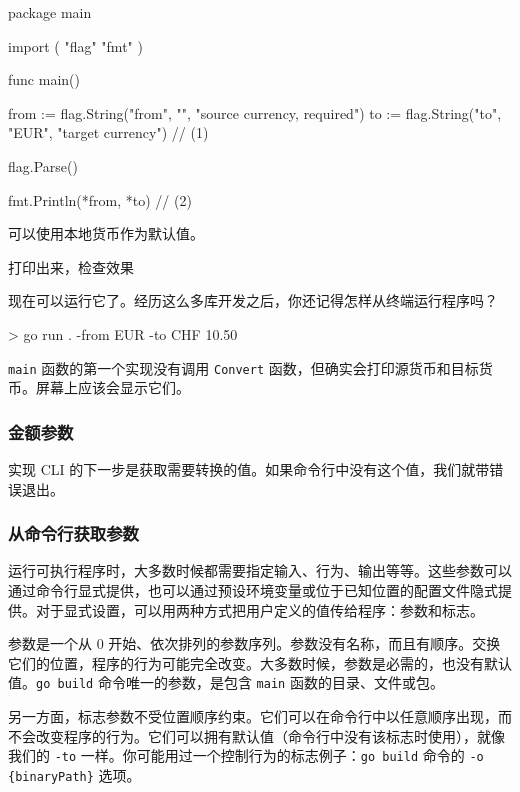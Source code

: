 \begin{gocode}[title={代码清单 6.26 \texttt{main.go}：解析标志}]
package main

import (
    "flag"
    "fmt"
)

func main() {
    from := flag.String("from", "", "source currency, required")
    to := flag.String("to", "EUR", "target currency") // (1)

    flag.Parse()

    fmt.Println(*from, *to) // (2)
}
\end{gocode}

\begin{codeannotations}
\item 可以使用本地货币作为默认值。
\item 打印出来，检查效果
\end{codeannotations}

现在可以运行它了。经历这么多库开发之后，你还记得怎样从终端运行程序吗？

\begin{shellcode}[]
> go run . -from EUR -to CHF 10.50
\end{shellcode}

\texttt{main} 函数的第一个实现没有调用 \texttt{Convert} 函数，但确实会打印源货币和目标货币。屏幕上应该会显示它们。

\subsubsection*{金额参数}

实现 CLI 的下一步是获取需要转换的值。如果命令行中没有这个值，我们就带错误退出。

\subsubsection*{从命令行获取参数}

运行可执行程序时，大多数时候都需要指定输入、行为、输出等等。这些参数可以通过命令行显式提供，也可以通过预设环境变量或位于已知位置的配置文件隐式提供。对于显式设置，可以用两种方式把用户定义的值传给程序：参数和标志。

参数是一个从 0 开始、依次排列的参数序列。参数没有名称，而且有顺序。交换它们的位置，程序的行为可能完全改变。大多数时候，参数是必需的，也没有默认值。\texttt{go build} 命令唯一的参数，是包含 \texttt{main} 函数的目录、文件或包。

另一方面，标志参数不受位置顺序约束。它们可以在命令行中以任意顺序出现，而不会改变程序的行为。它们可以拥有默认值（命令行中没有该标志时使用），就像我们的 \texttt{-to} 一样。你可能用过一个控制行为的标志例子：\texttt{go build} 命令的 \texttt{-o \{binaryPath\}} 选项。

